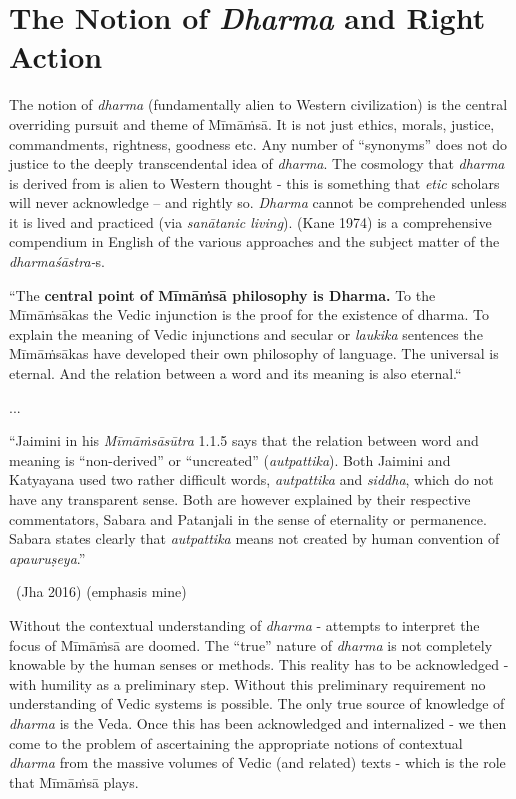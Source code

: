\section*{The Notion of \textit{Dharma} and Right Action}

The notion of \textit{dharma} (fundamentally alien to Western civilization) is the central overriding pursuit and theme of Mīmāṁsā. It is not just ethics, morals, justice, commandments, rightness, goodness etc. Any number of “synonyms” does not do justice to the deeply transcendental idea of \textit{dharma}. The cosmology that \textit{dharma} is derived from is alien to Western thought - this is something that \textit{etic} scholars will never acknowledge – and rightly so. \textit{Dharma} cannot be comprehended unless it is lived and practiced (via \textit{sanātanic living}). (Kane 1974) is a comprehensive compendium in English of the various approaches and the subject matter of the \textit{dharmaśāstra-}s.

\begin{myquote}
“The \textbf{central point of Mīmāṁsā philosophy is Dharma.} To the Mīmāṁsākas the Vedic injunction is the proof for the existence of dharma. To explain the meaning of Vedic injunctions and secular or \textit{laukika} sentences the Mīmāṁsākas have developed their own philosophy of language. The universal is eternal. And the relation between a word and its meaning is also eternal.“
\end{myquote}

\begin{myquote}
...
\end{myquote}

\begin{myquote}
“Jaimini in his \textit{Mīmāṁsāsūtra} 1.1.5 says that the relation between word and meaning is “non-derived” or “uncreated” (\textit{autpattika}). Both Jaimini and Katyayana used two rather difficult words, \textit{autpattika} and \textit{siddha}, which do not have any transparent sense. Both are however explained by their respective commentators, Sabara and Patanjali in the sense of eternality or permanence. Sabara states clearly that \textit{autpattika} means not created by human convention of \textit{apauruṣeya}.”

~\hfill (Jha 2016) (emphasis mine)
\end{myquote}

Without the contextual understanding of \textit{dharma }- attempts to interpret the focus of Mīmāṁsā are doomed. The “true” nature of \textit{dharma} is not completely knowable by the human senses or methods. This reality has to be acknowledged - with humility as a preliminary step. Without this preliminary requirement no understanding of Vedic systems is possible. The only true source of knowledge of \textit{dharma} is the Veda. Once this has been acknowledged and internalized - we then come to the problem of ascertaining the appropriate notions of contextual \textit{dharma} from the massive volumes of Vedic (and related) texts - which is the role that Mīmāṁsā plays.


